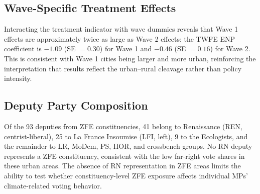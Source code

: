 \documentclass[12pt]{article}
\begin{document}
\subsection{Wave-Specific Treatment Effects}

Interacting the treatment indicator with wave dummies reveals that Wave 1 effects are approximately twice as large as Wave 2 effects: the TWFE ENP coefficient is $-1.09$ (SE $= 0.30$) for Wave 1 and $-0.46$ (SE $= 0.16$) for Wave 2. This is consistent with Wave 1 cities being larger and more urban, reinforcing the interpretation that results reflect the urban--rural cleavage rather than policy intensity.

\subsection{Deputy Party Composition}

Of the 93 deputies from ZFE constituencies, 41 belong to Renaissance (REN, centrist-liberal), 25 to La France Insoumise (LFI, left), 9 to the Ecologists, and the remainder to LR, MoDem, PS, HOR, and crossbench groups. No RN deputy represents a ZFE constituency, consistent with the low far-right vote shares in these urban areas. The absence of RN representation in ZFE areas limits the ability to test whether constituency-level ZFE exposure affects individual MPs' climate-related voting behavior.
\end{document}
